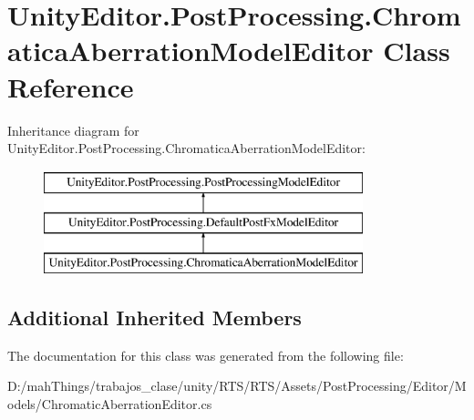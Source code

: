 \hypertarget{class_unity_editor_1_1_post_processing_1_1_chromatica_aberration_model_editor}{}\section{Unity\+Editor.\+Post\+Processing.\+Chromatica\+Aberration\+Model\+Editor Class Reference}
\label{class_unity_editor_1_1_post_processing_1_1_chromatica_aberration_model_editor}
Inheritance diagram for Unity\+Editor.\+Post\+Processing.\+Chromatica\+Aberration\+Model\+Editor\+:\begin{figure}[H]
\begin{center}
\leavevmode
\includegraphics[height=3.000000cm]{class_unity_editor_1_1_post_processing_1_1_chromatica_aberration_model_editor}
\end{center}
\end{figure}
\subsection*{Additional Inherited Members}


The documentation for this class was generated from the following file\+:\begin{DoxyCompactItemize}
\item 
D\+:/mah\+Things/trabajos\+\_\+clase/unity/\+R\+T\+S/\+R\+T\+S/\+Assets/\+Post\+Processing/\+Editor/\+Models/Chromatic\+Aberration\+Editor.\+cs\end{DoxyCompactItemize}

